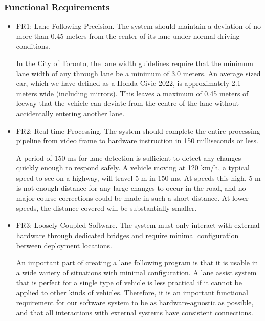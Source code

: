 \documentclass[titlepage, draft]{article}
\begin{document}
\subsubsection{Functional Requirements}
\begin{itemize}

	\item FR1: Lane Following Precision. The system should maintain a deviation of no more than 0.45 meters from the center of its lane under normal driving conditions.

	      In the City of Toronto, the lane width guidelines require that the minimum lane width of any through lane be a minimum
	      of 3.0 meters. \cite{LaneWidthsGuideline}
	      An average sized car, which we have defined as a Honda Civic 2022, is approximately 2.1 meters wide (including
	      mirrors). \cite{HondaCivicSpecs}
	      This leaves a maximum of 0.45 meters of leeway that the vehicle can deviate from the centre of the lane without
	      accidentally entering another lane.

	\item FR2: Real-time Processing.
	      The system should complete the entire processing pipeline from video frame to hardware instruction in 150 milliseconds or less.

	      A period of 150 ms for lane detection is sufficient to detect any changes quickly enough to respond safely. A vehicle moving at 120 km/h, a typical speed to see on a highway, will travel 5 m in 150 ms. At speeds this high, 5 m is not enough distance for any large changes to occur in the road, and no major course corrections could be made in such a short distance. At lower speeds, the distance covered will be substantially smaller.


	\item FR3: Loosely Coupled Software. The system must only interact with external hardware through dedicated bridges and require minimal configuration between deployment locations.

	      An important part of creating a lane following program is that it is usable in a wide variety of situations with minimal configuration. A lane assist system that is perfect for a single type of vehicle is less practical if it cannot be applied to other kinds of vehicles. Therefore, it is an important functional requirement for our software system to be as hardware-agnostic as possible, and that all interactions with external systems have consistent connections.

\end{itemize}
\end{document}
